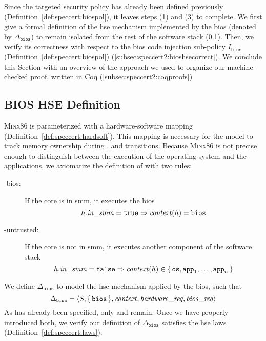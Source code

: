 Since the targeted security policy has already been defined previously
(Definition~\ref{def:speccert:biospol}), it leaves steps (1) and (3) to
complete.
%
We first give a formal definition of the \ac{hse} mechanism implemented by the
\ac{bios} (denoted by \( \Delta_{\mathtt{bios}} \)) to remain isolated from the
rest of the software stack (\ref{subsec:speccert2:bioshsedef}).
%
Then, we verify its correctness with respect to the \ac{bios} code injection
sub-policy \( I_{\mathtt{bios}} \) (Definition~\ref{def:speccert:biospol})
(\ref{subsec:speccert2:bioshsecorrect}).
%
We conclude this Section with an overview of the approach we used to organize
our machine-checked proof, written in Coq (\ref{subsec:speccert2:coqproofs})

\subsection{BIOS HSE Definition}
\label{subsec:speccert2:bioshsedef}

{\scshape Minx86} is parameterized with a hardware-software mapping
 (Definition~\ref{def:speccert:hardsoft}).
%
This mapping is necessary for the model to track memory ownership during
,  and  transitions.
%
Because {\scshape Minx86} is not precise enough to distinguish between the
execution of the operating system and the applications, we axiomatize the
definition of  with two rules:
%
\begin{description}
\item [-bios:] If the core is in \ac{smm}, it executes the
  \ac{bios}
  \[
    h.\mathit{in\_smm} = \mathtt{true} \Rightarrow \mathit{context}(h) = \mathtt{bios}
  \]
\item [-untrusted:] If the core is not in \ac{smm}, it executes
  another component of the software stack
  \[
    h.\mathit{in\_smm} = \mathtt{false} \Rightarrow \mathit{context}(h) \in
    \{\,\mathtt{os}, \mathtt{app}_1, \dots, \mathtt{app}_n\,\}
  \]
\end{description}


We define $\Delta_{\mathtt{bios}}$ to model the \ac{hse} mechanism applied by
the \ac{bios}, such that
\[
  \Delta_{\mathtt{bios}} = \langle S, \{\,\mathtt{bios}\,\},
  \mathit{context}, \mathit{hardware\_req}, \mathit{bios\_req} \rangle
\]
%
As  has already been specified, only  and
 remain.
%
Once we have properly introduced both, we verify our definition of
\( \Delta_{\mathtt{bios}} \) satisfies the \ac{hse} laws
(Definition~\ref{def:speccert:laws}).

